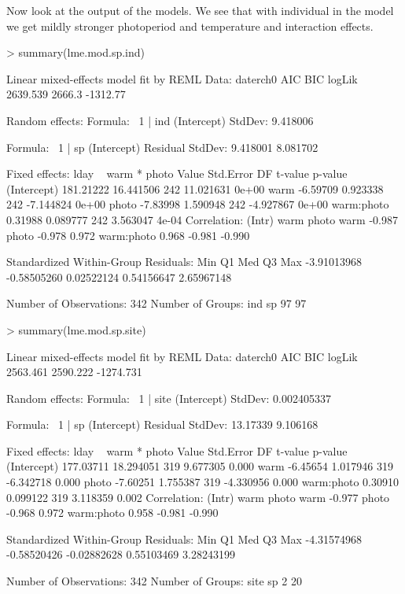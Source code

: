 \documentclass{article}
\begin{document}
Now look at the output of the models. We see that with individual in the model we get mildly stronger photoperiod and temperature and interaction effects.
\begin{Schunk}
\begin{Sinput}
> summary(lme.mod.sp.ind)
\end{Sinput}
\begin{Soutput}
Linear mixed-effects model fit by REML
 Data: daterch0 
       AIC    BIC   logLik
  2639.539 2666.3 -1312.77

Random effects:
 Formula: ~1 | ind
        (Intercept)
StdDev:    9.418006

 Formula: ~1 | sp %in% ind
        (Intercept) Residual
StdDev:    9.418001 8.081702

Fixed effects: lday ~ warm * photo 
                Value Std.Error  DF   t-value p-value
(Intercept) 181.21222 16.441506 242 11.021631   0e+00
warm         -6.59709  0.923338 242 -7.144824   0e+00
photo        -7.83998  1.590948 242 -4.927867   0e+00
warm:photo    0.31988  0.089777 242  3.563047   4e-04
 Correlation: 
           (Intr) warm   photo 
warm       -0.987              
photo      -0.978  0.972       
warm:photo  0.968 -0.981 -0.990

Standardized Within-Group Residuals:
        Min          Q1         Med          Q3         Max 
-3.91013968 -0.58505260  0.02522124  0.54156647  2.65967148 

Number of Observations: 342
Number of Groups: 
        ind sp %in% ind 
         97          97 
\end{Soutput}
\begin{Sinput}
> summary(lme.mod.sp.site)
\end{Sinput}
\begin{Soutput}
Linear mixed-effects model fit by REML
 Data: daterch0 
       AIC      BIC    logLik
  2563.461 2590.222 -1274.731

Random effects:
 Formula: ~1 | site
        (Intercept)
StdDev: 0.002405337

 Formula: ~1 | sp %in% site
        (Intercept) Residual
StdDev:    13.17339 9.106168

Fixed effects: lday ~ warm * photo 
                Value Std.Error  DF   t-value p-value
(Intercept) 177.03711 18.294051 319  9.677305   0.000
warm         -6.45654  1.017946 319 -6.342718   0.000
photo        -7.60251  1.755387 319 -4.330956   0.000
warm:photo    0.30910  0.099122 319  3.118359   0.002
 Correlation: 
           (Intr) warm   photo 
warm       -0.977              
photo      -0.968  0.972       
warm:photo  0.958 -0.981 -0.990

Standardized Within-Group Residuals:
        Min          Q1         Med          Q3         Max 
-4.31574968 -0.58520426 -0.02882628  0.55103469  3.28243199 

Number of Observations: 342
Number of Groups: 
        site sp %in% site 
           2           20 
\end{Soutput}
\end{Schunk}
\end{document}
